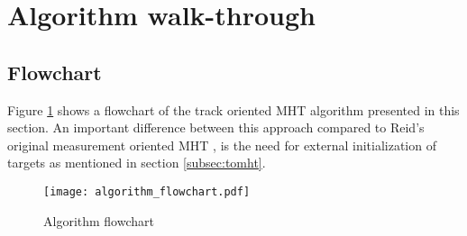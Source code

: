 \section{Algorithm walk-through}
\label{sec:algorithm}
\subsection{Flowchart}
Figure \ref{fig:algorithm_flow} shows a flowchart of the track oriented MHT algorithm presented in this section. An important difference between this approach compared to Reid's original measurement oriented MHT \cite{Reid1978}, is the need for external initialization of targets as mentioned in section \ref{subsec:tomht}.

\begin{figure}[H]
\centering
\texttt{[image: algorithm\_flowchart.pdf]}
\caption{Algorithm flowchart}
\label{fig:algorithm_flow}
\end{figure}

